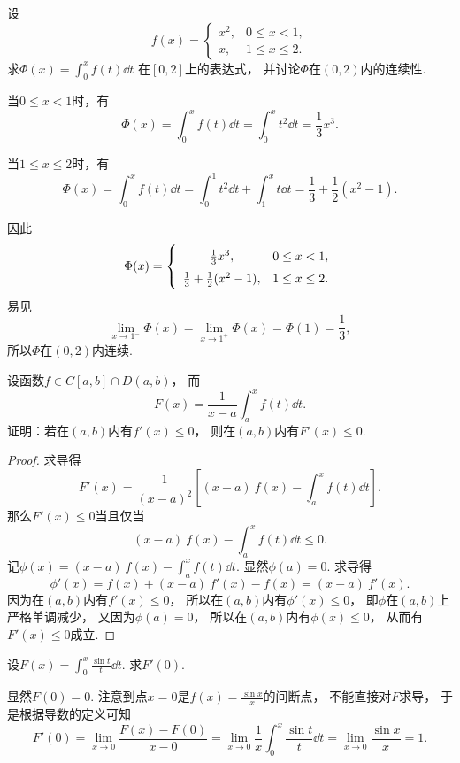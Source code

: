 \begin{example}
设\[
	f(x) = \left\{ \begin{array}{cl}
		x^2, & 0 \leq x < 1, \\
		x, & 1 \leq x \leq 2.
	\end{array} \right.
\]
求\(\Phi(x) = \int_0^x f(t) \dd{t}\)
在\([0,2]\)上的表达式，
并讨论\(\Phi\)在\((0,2)\)内的连续性.
\begin{solution}
当\(0 \leq x < 1\)时，有\[
	\Phi(x) = \int_0^x f(t) \dd{t}
	= \int_0^x t^2 \dd{t}
	= \frac13 x^3.
\]

当\(1 \leq x \leq 2\)时，有\[
	\Phi(x) = \int_0^x f(t) \dd{t}
	= \int_0^1 t^2 \dd{t}
	+ \int_1^x t \dd{t}
	= \frac13 + \frac12 (x^2-1).
\]

因此\[
	\Phi(x) = \left\{ \def\arraystretch{1.5} \begin{array}{cl}
		\frac13 x^3, & 0 \leq x < 1, \\
		\frac13 + \frac12 (x^2-1), & 1 \leq x \leq 2.
	\end{array} \right.
\]
易见\[
	\lim_{x\to1^-} \Phi(x)
	= \lim_{x\to1^+} \Phi(x)
	= \Phi(1)
	= \frac13,
\]
所以\(\Phi\)在\((0,2)\)内连续.
\end{solution}
\end{example}

\begin{example}
设函数\(f \in C[a,b] \cap D(a,b)\)，
而\[
	F(x) = \frac1{x-a} \int_a^x f(t) \dd{t}.
\]
证明：若在\((a,b)\)内有\(f'(x) \leq 0\)，
则在\((a,b)\)内有\(F'(x) \leq 0\).
\begin{proof}
求导得\begin{equation*}
	F'(x) = \frac1{(x-a)^2} \left[ (x-a)~f(x) - \int_a^x f(t) \dd{t} \right].
\end{equation*}
那么\(F'(x) \leq 0\)当且仅当\[
	(x-a)~f(x) - \int_a^x f(t) \dd{t} \leq 0.
\]
记\(\phi(x) = (x-a)~f(x) - \int_a^x f(t) \dd{t}\).
显然\(\phi(a) = 0\).
求导得\[
	\phi'(x) = f(x) + (x-a)~f'(x) - f(x)
	= (x-a)~f'(x).
\]
因为在\((a,b)\)内有\(f'(x) \leq 0\)，
所以在\((a,b)\)内有\(\phi'(x) \leq 0\)，
即\(\phi\)在\((a,b)\)上严格单调减少，
又因为\(\phi(a) = 0\)，
所以在\((a,b)\)内有\(\phi(x) \leq 0\)，
从而有\(F'(x) \leq 0\)成立.
\end{proof}
\end{example}
\begin{example}
设\(F(x) = \int_0^x \frac{\sin t}{t} \dd{t}\).
求\(F'(0)\).
\begin{solution}
显然\(F(0) = 0\).
注意到点\(x=0\)是\(f(x) = \frac{\sin x}{x}\)的间断点，
不能直接对\(F\)求导，
于是根据导数的定义可知\begin{equation*}
	F'(0) = \lim_{x\to0} \frac{F(x)-F(0)}{x-0}
	= \lim_{x\to0} \frac1x \int_0^x \frac{\sin t}{t} \dd{t}
	= \lim_{x\to0} \frac{\sin x}{x}
	= 1.
\end{equation*}
\end{solution}
\end{example}

